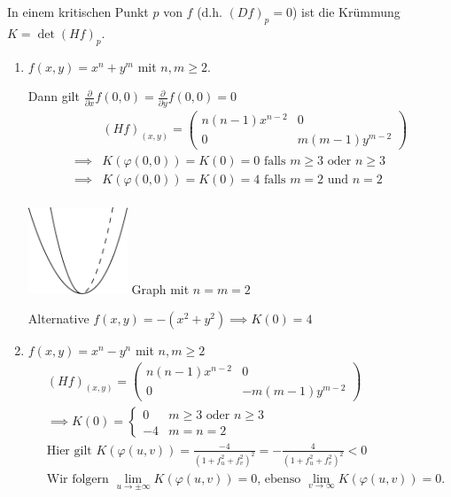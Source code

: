 \documentclass[../main.tex]{subfiles}
\begin{document}
In einem kritischen Punkt $p$ von $f$ (d.h. $(Df)_p = 0$) ist die Krümmung $K = \det(Hf)_{p}$.
\begin{examples}
    \leavevmode
    \begin{enumerate} 
        \item $f(x,y) = x^{n}+y^{m}$ mit $n,m \geq 2$.
        
        \begin{minipage}{0.7\columnwidth}
            Dann gilt $\frac{\partial}{\partial x}f(0,0) = \frac{\partial}{\partial y}f(0,0) = 0$
        \begin{align*}
            &(Hf)_{(x,y)} = \begin{pmatrix}
                n(n-1)x^{n-2} & 0 \\ 0 & m(m-1)y^{m-2}
            \end{pmatrix}\\
            \implies &K(\varphi(0,0))=K(0)=0 \text{ falls } m\geq 3 \text{ oder } n\geq 3\\
            \implies &K(\varphi(0,0))=K(0)=4 \text{ falls } m = 2 \text{ und } n = 2\\
        \end{align*}
        \end{minipage}
        \hspace{0.05\linewidth}
        \begin{minipage}{0.3\columnwidth}
            \includegraphics[width=8em]{figures/graph.pdf}
            \linebreak Graph mit $n=m=2$
        \end{minipage}

        Alternative $f(x,y) = -(x^{2}+y^{2}) \implies K(0) = 4$
        \item $f(x,y)= x^{n}-y^{n}$ mit $n,m \geq 2$
        \begin{align*}
            &(Hf)_{(x,y)}=\begin{pmatrix}
                n(n-1)x^{n-2} & 0\\ 0 & -m(m-1)y^{m-2}
            \end{pmatrix}\\
            &\implies K(0) = \begin{cases}
                0  &m\geq 3 \text{ oder } n \geq 3 \\
                -4  &m=n=2 
            \end{cases}\\
            &\text{Hier gilt }K(\varphi(u,v)) = \frac{-4}{(1+f_{u}^{2}+f_{v}^{2})^{2}} = -\frac{4}{(1+f_{u}^{2}+f_{v}^{2})^{2}} < 0\\
            &\text{Wir folgern } \lim\limits_{u\to\pm\infty}K(\varphi(u,v)) = 0 \text{, ebenso } \lim\limits_{v\to\infty}K(\varphi(u,v)) = 0.
        \end{align*}
    \end{enumerate}
\end{examples}
\end{document}
